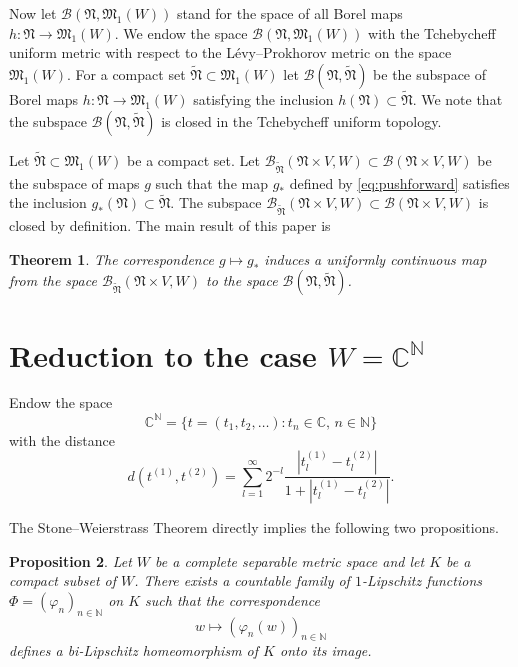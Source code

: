 \documentclass[12pt,a4paper]{article}
\newtheorem{theorem}{Theorem}[section]
\newtheorem{proposition}[theorem]{Proposition}
\theoremstyle{definition}
\theoremstyle{remark}
\newcommand{\BB}{\mathscr{B}}
\newcommand{\MM}{{\mathfrak{M}}}
\newcommand{\NN}{{\mathfrak{N}}}
\begin{document}
	Now let $\BB(\NN, \MM_1(W))$ stand for the space of all Borel maps $h \colon \NN \to \MM_1(W)$. We endow the space $\BB(\NN, \MM_1(W))$ with the
	Tchebycheff uniform metric with respect to the L\'evy--Prokhorov metric on the space $\MM_1(W)$. For a compact set
	$\widetilde{\NN} \subset \MM_1(W)$ let $\BB(\NN, \widetilde{\NN})$ be the subspace of Borel maps
	$h \colon \NN \to \MM_1(W)$ satisfying the inclusion $h(\NN) \subset \widetilde{\NN}$. We note that the subspace $\BB(\NN, \widetilde{\NN})$
	is closed in the Tchebycheff uniform topology.
	
	Let $\widetilde{\NN} \subset \MM_1(W)$ be a compact set. Let $\BB_{\widetilde{\NN}}(\NN \times V, W)\subset \BB(\NN \times V, W)$ be the
	subspace of maps $g$ such that the map $g_*$ defined by \eqref{eq:pushforward}
	satisfies the inclusion $g_*(\NN) \subset \widetilde{\NN}$. The subspace $\BB_{\widetilde{\NN}}(\NN \times V, W) \subset \BB(\NN \times V, W)$
	is closed by definition.
	The main result of this paper is
	
	\begin{theorem}
		\label{thm:main}
		The correspondence $g \mapsto g_*$ induces a uniformly continuous map from the space
		$\BB_{\widetilde{\NN}}(\NN \times V, W)$ to the space $\BB(\NN, \widetilde{\NN})$.
	\end{theorem}
	
	\section{Reduction to the case $W = \mathbb{C}^{\mathbb{N}}$}
	
	Endow the space
	\[
	\mathbb{C}^{\mathbb{N}} = \{ t = (t_1, t_2, \ldots) : t_n \in \mathbb{C},\, n \in \mathbb{N} \}
	\]
	with the distance
	\[
	d(t^{(1)}, t^{(2)}) =
	\sum_{l=1}^{\infty}
	2^{-l}
	\frac{|t^{(1)}_l - t^{(2)}_l|}{1 + |t^{(1)}_l - t^{(2)}_l|}.
	\]
	
	The Stone--Weierstrass Theorem directly implies the following two propositions.
	
	\begin{proposition}
		\label{prop:2.1}
		Let $W$ be a complete separable metric space and let $K$ be a compact subset of $W$.
		There exists a countable family of $1$-Lipschitz functions $\Phi = (\varphi_n)_{n \in \mathbb{N}}$ on $K$
		such that the correspondence
		\[
		w \mapsto (\varphi_n(w))_{n \in \mathbb{N}}
		\]
		defines a bi-Lipschitz homeomorphism of $K$ onto its image.
	\end{proposition}
	
\end{document}
